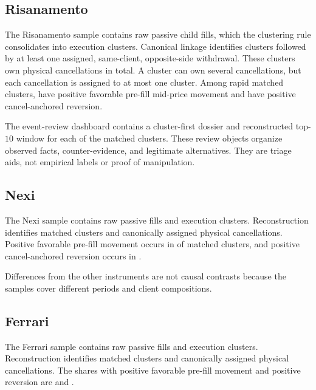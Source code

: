 \documentclass[11pt]{article}
\begin{document}
\subsection{Risanamento}
\label{subsec:risanamento_results}

The Risanamento sample contains \RisanamentoRawFills{} raw passive child fills, which the clustering rule consolidates into
\RisanamentoClusters{} execution clusters. Canonical linkage identifies \RisanamentoMatchedClusters{} clusters followed by
at least one assigned, same-client, opposite-side withdrawal. These clusters own
\RisanamentoAssignedCancellations{} physical cancellations in total. A cluster can own several cancellations, but each
cancellation is assigned to at most one cluster. Among rapid matched clusters, \RisanamentoFPMShare{} have positive
favorable pre-fill mid-price movement and \RisanamentoREVShare{} have positive cancel-anchored reversion.

The event-review dashboard contains a cluster-first dossier and reconstructed top-$10$ window for each of the
\RisanamentoMatchedClusters{} matched clusters. These review objects organize observed facts, counter-evidence, and
legitimate alternatives. They are triage aids, not empirical labels or proof of manipulation.

\subsection{Nexi}
\label{subsec:nexi_results}

The Nexi sample contains \NexiRawFills{} raw passive fills and \NexiClusters{} execution clusters. Reconstruction identifies
\NexiMatchedClusters{} matched clusters and \NexiAssignedCancellations{} canonically assigned physical cancellations.
Positive favorable pre-fill movement occurs in \NexiFPMShare{} of matched clusters, and positive cancel-anchored reversion
occurs in \NexiREVShare{}.

Differences from the other instruments are not causal contrasts because the samples cover different periods and client
compositions.

\subsection{Ferrari}
\label{subsec:ferrari_results}

The Ferrari sample contains \FerrariRawFills{} raw passive fills and \FerrariClusters{} execution clusters. Reconstruction
identifies \FerrariMatchedClusters{} matched clusters and \FerrariAssignedCancellations{} canonically assigned physical
cancellations. The shares with positive favorable pre-fill movement and positive reversion are \FerrariFPMShare{} and
\FerrariREVShare{}.
\end{document}
